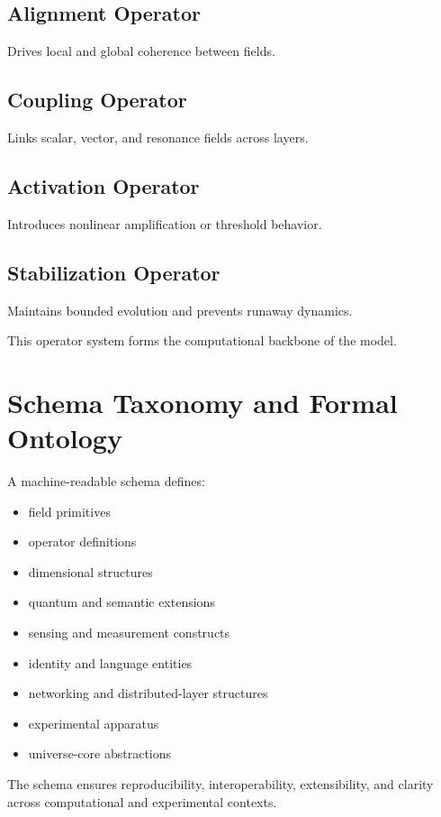 \documentclass[12pt]{article}
\begin{document}
\subsection{Alignment Operator}
Drives local and global coherence between fields.

\subsection{Coupling Operator}
Links scalar, vector, and resonance fields across layers.

\subsection{Activation Operator}
Introduces nonlinear amplification or threshold behavior.

\subsection{Stabilization Operator}
Maintains bounded evolution and prevents runaway dynamics.

This operator system forms the computational backbone of the model.

\section{Schema Taxonomy and Formal Ontology}

A machine-readable schema defines:

\begin{itemize}
    \item field primitives
    \item operator definitions
    \item dimensional structures
    \item quantum and semantic extensions
    \item sensing and measurement constructs
    \item identity and language entities
    \item networking and distributed-layer structures
    \item experimental apparatus
    \item universe-core abstractions
\end{itemize}

The schema ensures reproducibility, interoperability, extensibility, and clarity across computational and experimental contexts.
\end{document}
